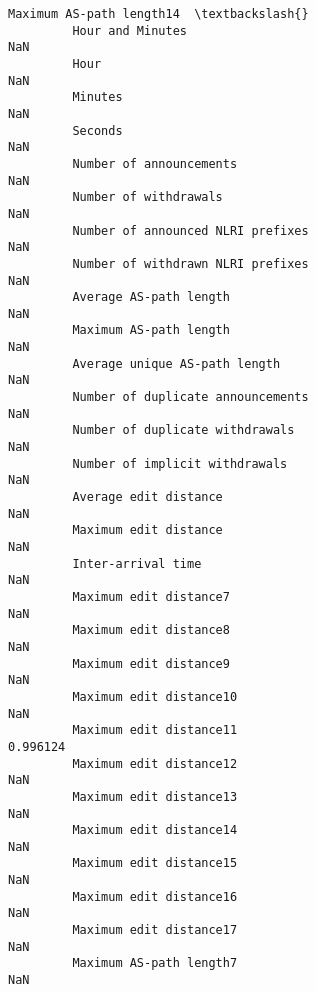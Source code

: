 \documentclass[11pt]{article}
\begin{document}
\begin{Verbatim}[commandchars=\\\{\}]
                                                            Maximum AS-path length14  \textbackslash{}
         Hour and Minutes                                                        NaN   
         Hour                                                                    NaN   
         Minutes                                                                 NaN   
         Seconds                                                                 NaN   
         Number of announcements                                                 NaN   
         Number of withdrawals                                                   NaN   
         Number of announced NLRI prefixes                                       NaN   
         Number of withdrawn NLRI prefixes                                       NaN   
         Average AS-path length                                                  NaN   
         Maximum AS-path length                                                  NaN   
         Average unique AS-path length                                           NaN   
         Number of duplicate announcements                                       NaN   
         Number of duplicate withdrawals                                         NaN   
         Number of implicit withdrawals                                          NaN   
         Average edit distance                                                   NaN   
         Maximum edit distance                                                   NaN   
         Inter-arrival time                                                      NaN   
         Maximum edit distance7                                                  NaN   
         Maximum edit distance8                                                  NaN   
         Maximum edit distance9                                                  NaN   
         Maximum edit distance10                                                 NaN   
         Maximum edit distance11                                            0.996124   
         Maximum edit distance12                                                 NaN   
         Maximum edit distance13                                                 NaN   
         Maximum edit distance14                                                 NaN   
         Maximum edit distance15                                                 NaN   
         Maximum edit distance16                                                 NaN   
         Maximum edit distance17                                                 NaN   
         Maximum AS-path length7                                                 NaN   

\end{Verbatim}
\end{document}
